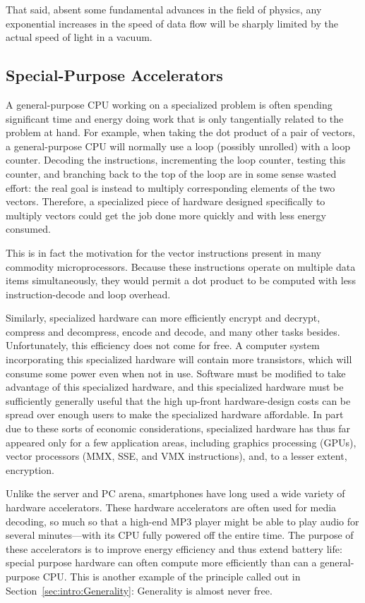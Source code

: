 That said, absent some fundamental advances in the field of physics,
any exponential increases in the speed of data flow
will be sharply limited by the actual speed of light in a vacuum.

\subsection{Special-Purpose Accelerators}
\label{sec:cpu:Special-Purpose Accelerators}

A general-purpose CPU working on a specialized problem is often spending
significant time and energy doing work that is only tangentially related
to the problem at hand.
For example, when taking the dot product of a pair of vectors, a
general-purpose CPU will normally use a loop (possibly unrolled)
with a loop counter.
Decoding the instructions, incrementing the loop counter, testing this
counter, and branching back to the
top of the loop are in some sense wasted effort: the real goal is
instead to multiply corresponding elements of the two vectors.
Therefore, a specialized piece of hardware designed specifically to
multiply vectors could get the job done more quickly and with less
energy consumed.

This is in fact the motivation for the vector instructions present in
many commodity microprocessors.
Because these instructions operate on multiple data items simultaneously,
they would permit a dot product to be computed with less instruction-decode
and loop overhead.

Similarly, specialized hardware can more efficiently encrypt and decrypt,
compress and decompress, encode and decode, and many other tasks besides.
Unfortunately, this efficiency does not come for free.
A computer system incorporating this specialized hardware will contain
more transistors, which will consume some power even when not in use.
Software must be modified to take advantage of this specialized hardware,
and this specialized hardware must be sufficiently generally useful
that the high up-front hardware-design costs can be spread over enough
users to make the specialized hardware affordable.
In part due to these sorts of economic considerations, specialized
hardware has thus far appeared only for a few application areas,
including graphics processing (GPUs), vector processors (MMX, SSE,
and VMX instructions), and, to a lesser extent, encryption.

%
Unlike the server and PC arena, smartphones have long used a wide
variety of hardware accelerators.
These hardware accelerators are often used for media decoding,
so much so that a high-end MP3 player might be able to play audio
for several minutes---with its CPU fully powered off the entire time.
The purpose of these accelerators is to improve energy efficiency
and thus extend battery life: special purpose hardware can often
compute more efficiently than can a general-purpose CPU.
This is another example of the principle called out in
Section~\ref{sec:intro:Generality}: Generality is almost never free.

